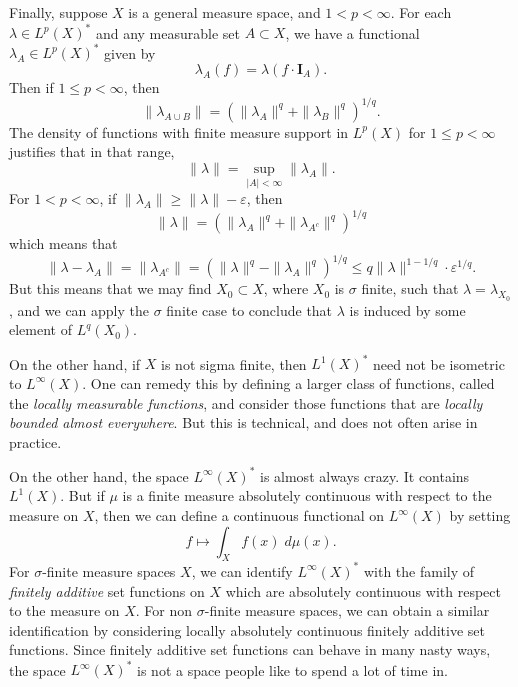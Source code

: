 \begin{example}
    Finally, suppose $X$ is a general measure space, and $1 < p < \infty$. For each $\lambda \in L^p(X)^*$ and any measurable set $A \subset X$, we have a functional $\lambda_A \in L^p(X)^*$ given by
    \[ \lambda_A(f) = \lambda(f \cdot \mathbf{I}_A). \]
    Then if $1 \leq p < \infty$, then
    \[ \| \lambda_{A \cup B} \| = \left( \| \lambda_A \|^q + \| \lambda_B \|^q \right)^{1/q}. \]
    The density of functions with finite measure support in $L^p(X)$ for $1 \leq p < \infty$ justifies that in that range,
    \[ \| \lambda \| = \sup_{|A| < \infty} \| \lambda_A \|. \]
    For $1 < p < \infty$, if $\| \lambda_A \| \geq \| \lambda \| - \varepsilon$, then
    \[ \| \lambda \| = \left( \| \lambda_A \|^q + \| \lambda_{A^c} \|^q \right)^{1/q} \]
    which means that
    \[ \| \lambda - \lambda_A \| = \| \lambda_{A^c} \| = \left( \| \lambda \|^q - \| \lambda_A \|^q \right)^{1/q} \leq q \| \lambda \|^{1-1/q} \cdot \varepsilon^{1/q}. \]
    But this means that we may find $X_0 \subset X$, where $X_0$ is $\sigma$ finite, such that $\lambda = \lambda_{X_0}$, and we can apply the $\sigma$ finite case to conclude that $\lambda$ is induced by some element of $L^q(X_0)$.

    On the other hand, if $X$ is not sigma finite, then $L^1(X)^*$ need not be isometric to $L^\infty(X)$. One can remedy this by defining a larger class of functions, called the \emph{locally measurable functions}, and consider those functions that are \emph{locally bounded almost everywhere}. But this is technical, and does not often arise in practice.

    On the other hand, the space $L^\infty(X)^*$ is almost always crazy. It contains $L^1(X)$. But if $\mu$ is a finite measure absolutely continuous with respect to the measure on $X$, then we can define a continuous functional on $L^\infty(X)$ by setting
    \[ f \mapsto \int_X f(x)\; d\mu(x). \]
    For $\sigma$-finite measure spaces $X$, we can identify $L^\infty(X)^*$ with the family of \emph{finitely additive} set functions on $X$ which are absolutely continuous with respect to the measure on $X$. For non $\sigma$-finite measure spaces, we can obtain a similar identification by considering locally absolutely continuous finitely additive set functions. Since finitely additive set functions can behave in many nasty ways, the space $L^\infty(X)^*$ is not a space people like to spend a lot of time in.
\end{example}

